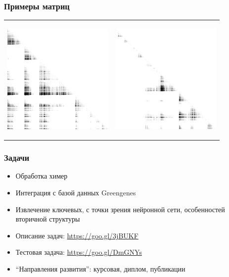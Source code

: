 \documentclass{beamer}
\begin{document}
\begin{frame}[fragile]
\transwipe[direction=90]
\frametitle{Примеры матриц}
  \begin{tabular}{p{6cm} p{6cm}}
   \begin{center}
      \includegraphics[height=5.4cm]{pictures/4.png}
    \end{center}
    &
    \begin{center}
      \includegraphics[height=5.4cm]{pictures/1.png}
    \end{center}

  \end{tabular}
\end{frame}
      
\begin{frame}[fragile]
\transwipe[direction=90]
\frametitle{Задачи}
\begin{itemize}
\item Обработка химер
\item Интеграция с базой данных Greengenes
\item Извлечение ключевых, с точки зрения нейронной сети, особенностей вторичной структуры
\item Описание задач: \url{https://goo.gl/3jBUKF}
\item Тестовая задача: \url{https://goo.gl/DmGNYs}
\item ``Направления развития'': курсовая, диплом, публикации
\end{itemize}
\end{frame}
\end{document}
